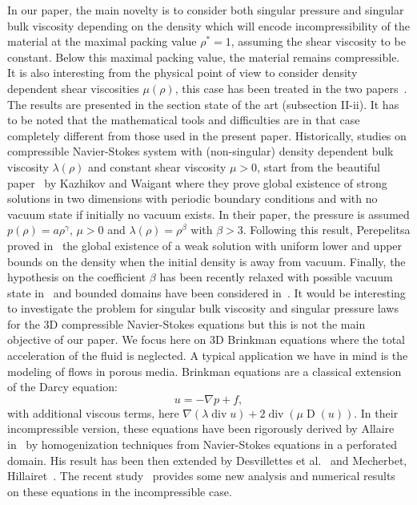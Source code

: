\documentclass[JEP,XML,SOM,Unicode,NoEqCountersInSection]{cedram}
\newcommand{\<}{\bigl\langle}
\renewcommand{\>}{\bigr\rangle}
\theoremstyle{definition}
\theoremstyle{remark}
\DeclareMathOperator{\Div}{div}
\DeclareMathOperator{\D}{D}
\begin{document}
In our paper, the main novelty is to consider both singular pressure and singular bulk viscosity depending on the density which will encode incompressibility of the material at the maximal packing value $\rho^*=1$, assuming the shear viscosity to be constant.
Below this maximal packing value, the material remains compressible.
It is also interesting from the physical point of view to consider density dependent shear viscosities $\mu(\rho)$, this case has been treated in the two papers~\cite{perrin2016,perrin2017}.
The results are presented in the section state of the art (subsection II-ii).
It has to be noted that the mathematical tools and difficulties are in that case completely different from those used in the present paper.
Historically, studies on compressible Navier-Stokes system with (non-singular) density dependent bulk viscosity $\lambda(\rho)$ and constant shear viscosity $\mu >0$, start from the beautiful paper~\cite{vaigant1995} by {Kazhikov} and {Waigant} where they prove global existence of strong solutions in two dimensions with periodic boundary conditions and with no vacuum state if initially no vacuum exists. In their paper, the pressure is assumed $p(\rho) = a \rho^\gamma$, $\mu > 0$ and $\lambda(\rho)= \rho^\beta$ with $\beta >3$.
Following this result, {Perepelitsa} proved in~\cite{perepelitsa2006} the global existence of a weak solution with uniform lower and upper bounds on the density when the initial density is away from vacuum.
Finally, the hypothesis on the coefficient $\beta$ has been recently relaxed with possible vacuum state in~\cite{huli2016} and bounded domains have been considered in~\cite{ducomet2013}.
It would be interesting to investigate the problem for singular bulk viscosity and singular pressure laws for the 3D compressible Navier-Stokes equations but this is not the main objective of our paper. We focus here on 3D Brinkman equations where the total acceleration of the fluid is neglected. A typical application we have in mind is the modeling of flows in porous media.
Brinkman equations are a classical extension of the Darcy equation:
\[
u = -\nabla p + f,
\]
with additional viscous terms, here $\nabla(\lambda\Div u) + 2\Div(\mu \D(u))$.
In their incompressible version, these equations have been rigorously derived by {Allaire} in~\cite{allaire1991} by homogenization techniques from Navier-Stokes equations in a perforated domain.
His result has been then extended by {Desvillettes} et al.\ \cite{desvillettes2008} and {Mecherbet}, {Hillairet}~\cite{mecherbet2018}.
The recent study~\cite{Nasser2017} provides some new analysis and numerical results on these equations in the incompressible case.
\end{document}
